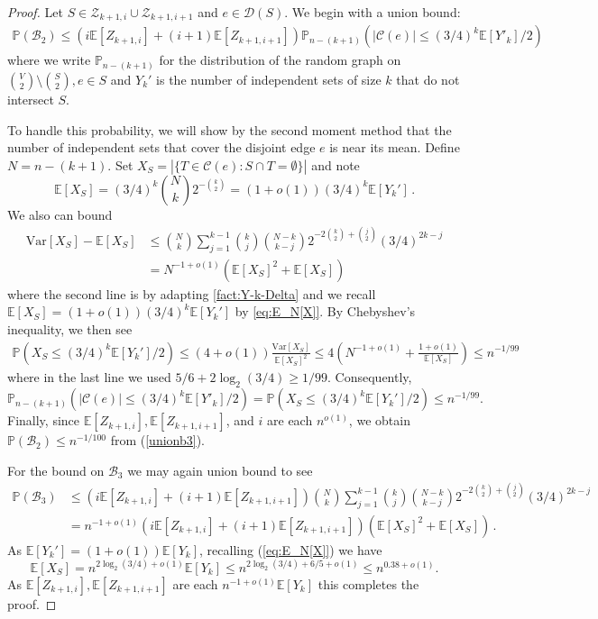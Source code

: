 \documentclass[10pt,a4paper]{amsart}
\newcommand{\EE}{\mathbb{E}}
\newcommand{\E}{\mathbb{E}}
\newcommand{\PP}{\mathbb{P}}
\newcommand{\cB}{\mathcal{B}}
\newcommand{\cC}{\mathcal{C}}
\newcommand{\cD}{\mathcal{D}}
\newcommand{\cZ}{\mathcal{Z}}
\begin{document}
\begin{proof}
    Let $S \in \cZ_{k+1,i} \cup \cZ_{k+1, i+1}$ and $e \in \cD(S)$.  We begin with a union bound:  \begin{align} \label{unionb3}
        \PP(\cB_2) \leq (i \E[Z_{k+1,i}] + (i+1)\E[ Z_{k+1, i+1}]) \PP_{n-(k+1)}\left( |\cC(e)| \leq (3/4)^k \E[Y'_k] / 2 \right)
    \end{align}
   where we write $\PP_{n-(k+1)}$ for the distribution of the random graph on $ \binom{V}{2} \setminus \binom{S}{2}, e \in S$ and
   $ Y_k'$ is the number of independent sets of size $k$ that do not intersect $S$.
   
    
    To handle this probability, we will show by the second moment method that the number of independent sets that cover the disjoint edge $e$ is near its mean.  Define $N = n- (k +1)$.  Set $X_S = | \{ T \in \cC(e) : S \cap T = \emptyset\}|$ and note \begin{equation} \label{eq:E_N[X]}
        \E[ X_S] = (3/4)^k \binom{N}{k} 2^{-\binom{k}{2}} = (1 + o(1)) (3/4)^k \E [Y_k']\,.
    \end{equation}  We also can bound \begin{align*}
        \mathrm{Var}[X_S] - \E[X_S] &\le \binom{N}{k} \sum_{j = 1}^{k-1} \binom{k}{j} \binom{N - k}{k - j}2^{-2\binom{k}{2} + \binom{j}{2}} (3/4)^{2k-j} \\
        &= N^{-1 + o(1)} \left(\E[X_S]^2 + \E[X_S]\right)
    \end{align*}
    where the second line is by adapting \cref{fact:Y-k-Delta} and we recall $\E[X_S] = (1 + o(1))(3/4)^k \E[Y_k']$ by \eqref{eq:E_N[X]}.  By Chebyshev's inequality, we then see \begin{align*}
        \PP(X_S \leq (3/4)^k \E [Y_k'] / 2) \leq (4 + o(1))\frac{\mathrm{Var}[X_S]}{\E [X_S]^2} \leq  4 \left(N^{-1 + o(1)} + \frac{1 + o(1)}{\E[X_S]} \right) \leq n^{-1/99}
    \end{align*}
    where in the last line we used $5/6 + 2\log_2(3/4) \geq 1/99$. Consequently, 
   $$ \PP_{n-(k+1)}\left( |\cC(e)| \leq (3/4)^k \E[Y'_k] / 2 \right)=\PP(X_S \leq (3/4)^k \E [Y_k'] / 2) \leq n^{-1/99}.$$
   Finally, since $\EE[Z_{k+1, i}], \E[ Z_{k+1,i+1}]$, and $i$ are each $n^{o(1)}$, we obtain 
$\PP(\cB_2 ) \leq  n^{-1/100}$ from (\ref{unionb3}).
   
    For the bound on $\cB_3$ we may again union bound to see \begin{align*}
        \PP(\cB_3) &\leq (i \E[Z_{k+1,i}] + (i+1) \E[ Z_{k+1, i+1}]) \binom{N}{k} \sum_{j = 1}^{k-1} \binom{k}{j} \binom{N - k}{k - j}2^{-2\binom{k}{2} + \binom{j}{2}} (3/4)^{2k-j} \\
        &= n^{-1 + o(1)}( i\E[Z_{k+1,i}] + (i+1) \E[ Z_{k+1, i+1}]) \left(\E[X_S]^2 + \E[X_S]\right)\,. 
    \end{align*}
    As $ \E[ Y_k'] = (1+o(1)) \E[Y_k]$, recalling (\ref{eq:E_N[X]}) we have
    $$\E[X_S] = n^{2\log_2(3/4) + o(1)} \E[Y_k] \le n^{2\log_2(3/4) + 6/5+o(1)}
    \le n^{0.38 +o(1)}.
    $$ As $\E[Z_{k+1,i}], \E[Z_{k+1,i+1}]$ are each $n^{-1 + o(1)} \E[Y_k]$ this completes the proof.
\end{proof}
\end{document}
